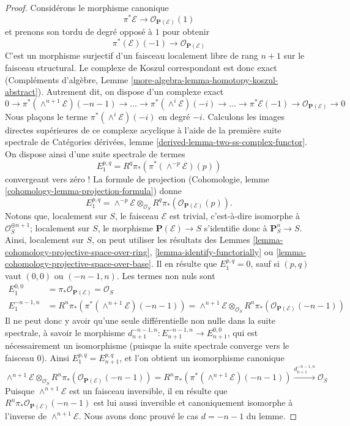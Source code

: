 \begin{proof}
Considérons le morphisme canonique
$$
\pi^*\mathcal{E} \longrightarrow \mathcal{O}_{\mathbf{P}(\mathcal{E})}(1)
$$
et prenons son tordu de degré opposé à $1$ pour obtenir
$$
\pi^*(\mathcal{E})(-1) \longrightarrow \mathcal{O}_{\mathbf{P}(\mathcal{E})}
$$
C'est un morphisme surjectif d'un faisceau localement libre de rang $n + 1$ sur le
faisceau structural. Le complexe de Koszul correspondant est
donc exact (Compléments d'algèbre, Lemme
\ref{more-algebra-lemma-homotopy-koszul-abstract}).
Autrement dit, on dispose d'un complexe exact
$$
0 \to
\pi^*(\wedge^{n + 1}\mathcal{E})(-n - 1) \to
\ldots \to
\pi^*(\wedge^i\mathcal{E})(-i) \to
\ldots \to
\pi^*\mathcal{E}(-1) \to
\mathcal{O}_{\mathbf{P}(\mathcal{E})} \to 0
$$
Nous plaçons le terme $\pi^*(\wedge^i\mathcal{E})(-i)$ en
degré $-i$.
Calculons les images directes supérieures de ce complexe
acyclique à l'aide de la première suite spectrale de
Catégories dérivées, lemme \ref{derived-lemma-two-ss-complex-functor}.
On dispose ainsi d'une suite spectrale de termes
$$
E_1^{p, q} = R^q\pi_*\left(\pi^*(\wedge^{-p}\mathcal{E})(p)\right)
$$
convergeant vers zéro ! La formule de projection
(Cohomologie, lemme \ref{cohomology-lemma-projection-formula})
donne
$$
E_1^{p, q} = \wedge^{-p} \mathcal{E} \otimes_{\mathcal{O}_S}
R^q\pi_*\left(\mathcal{O}_{\mathbf{P}(\mathcal{E})}(p)\right).
$$
Notons que, localement sur $S$, le faisceau $\mathcal{E}$ est trivial,
c'est-à-dire isomorphe à $\mathcal{O}_S^{\oplus n + 1}$; localement sur
$S$, le morphisme $\mathbf{P}(\mathcal{E}) \to S$ s'identifie donc
à $\mathbf{P}^n_S \to S$. Ainsi,
localement sur $S$, on peut utiliser les résultats des Lemmes
\ref{lemma-cohomology-projective-space-over-ring},
\ref{lemma-identify-functorially} ou
\ref{lemma-cohomology-projective-space-over-base}.
Il en résulte que $E_1^{p, q} = 0$, sauf si $(p, q)$ vaut $(0, 0)$
ou $(-n - 1, n)$. Les termes non nuls sont
\begin{align*}
E_1^{0, 0} & = \pi_*\mathcal{O}_{\mathbf{P}(\mathcal{E})} = \mathcal{O}_S \\
E_1^{-n - 1, n} & =
R^n\pi_*\left(\pi^*(\wedge^{n + 1}\mathcal{E})(-n - 1)\right) =
\wedge^{n + 1}\mathcal{E} \otimes_{\mathcal{O}_S}
R^n\pi_*\left(\mathcal{O}_{\mathbf{P}(\mathcal{E})}(-n - 1)\right)
\end{align*}
Il ne peut donc y avoir qu'une seule différentielle
non nulle dans la suite spectrale, à savoir le morphisme
$d_{n + 1}^{-n - 1, n} : E_{n + 1}^{-n - 1, n} \to E_{n + 1}^{0, 0}$,
qui est nécessairement un isomorphisme (puisque la suite spectrale converge vers
le faisceau $0$). Ainsi $E_1^{p, q} = E_{n + 1}^{p, q}$,
et l'on obtient un isomorphisme canonique
$$
\wedge^{n + 1}\mathcal{E} \otimes_{\mathcal{O}_S}
R^n\pi_*\left(\mathcal{O}_{\mathbf{P}(\mathcal{E})}(-n - 1)\right) =
R^n\pi_*\left(\pi^*(\wedge^{n + 1}\mathcal{E})(-n - 1)\right)
\xrightarrow{d_{n + 1}^{-n - 1, n}}
\mathcal{O}_S
$$
Puisque $\wedge^{n + 1}\mathcal{E}$ est un faisceau
inversible, il en résulte que
$R^n\pi_*\mathcal{O}_{\mathbf{P}(\mathcal{E})}(-n - 1)$ est lui
aussi inversible et canoniquement isomorphe à l'inverse de
$\wedge^{n + 1}\mathcal{E}$. Nous avons donc prouvé le cas
$d = - n - 1$ du lemme.


\end{proof}
